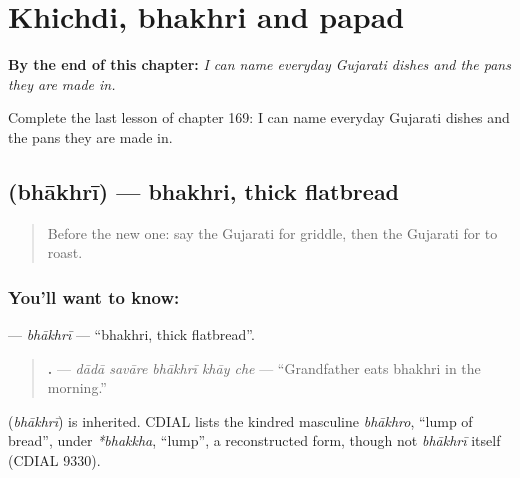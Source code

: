 
\chapter{Khichdi, bhakhri and papad}
\label{ch:gu-khichdi-bhakhri-and-papad}

\begin{chapteropening}
\textbf{By the end of this chapter:} \emph{I can name everyday Gujarati dishes and the pans they are made in.}

Complete the last lesson of chapter 169: I can name everyday Gujarati dishes and the pans they are made in.
\end{chapteropening}

\section[\texorpdfstring{\gu{ભાખરી} (bhākhrī)}{ભાખરી (bhākhrī)}]{ (bhākhrī) — bhakhri, thick flatbread}

\label{lesson:GU-C169-bhakhri}



\begin{quote}
Before the new one: say the Gujarati for griddle, then the Gujarati for to roast.
\end{quote}

\subsection*{You'll want to know: }
\textbf{} — \emph{bhākhrī} — \textquotedblleft{}bhakhri, thick flatbread\textquotedblright{}.

\begin{quote}
\textbf{    .} — \emph{dādā savāre bhākhrī khāy che} — \textquotedblleft{}Grandfather eats bhakhri in the morning.\textquotedblright{}
\end{quote}

\begin{cousinweb}
\textbf{} (\emph{bhākhrī}) is inherited. CDIAL lists the kindred masculine \emph{bhākhro}, \textquotedblleft{}lump of bread\textquotedblright{}, under \emph{*bhakkha}, \textquotedblleft{}lump\textquotedblright{}, a reconstructed form, though not \emph{bhākhrī} itself (CDIAL 9330).
\end{cousinweb}

